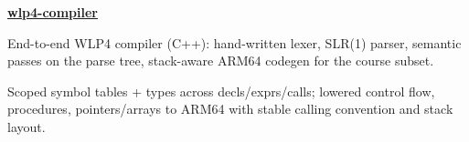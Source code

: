 \begin{twocolentry}{}
\href{https://github.com/faketut/C-class-compiler}{\textbf{wlp4-compiler}}
\end{twocolentry}
\begin{onecolentry}
\begin{highlights}
\item End-to-end WLP4 compiler (C++): hand-written lexer, SLR(1) parser, semantic passes on the parse tree, stack-aware ARM64 codegen for the course subset.
\item Scoped symbol tables + types across decls/exprs/calls; lowered control flow, procedures, pointers/arrays to ARM64 with stable calling convention and stack layout.
\end{highlights}
\end{onecolentry}
